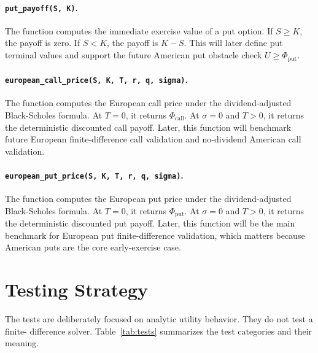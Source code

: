 \documentclass[11pt,a4paper]{article}
\newcommand{\code}[1]{\texttt{#1}}
\begin{document}
\paragraph{\code{put\_payoff(S, K)}.}
The function computes the immediate exercise value of a put option. If \(S\geq K\), the payoff is
zero. If \(S<K\), the payoff is \(K-S\). This will later define put terminal values and support the
future American put obstacle check \(U\geq\Phi_{\mathrm{put}}\).

\paragraph{\code{european\_call\_price(S, K, T, r, q, sigma)}.}
The function computes the European call price under the dividend-adjusted Black-Scholes formula.
At \(T=0\), it returns \(\Phi_{\mathrm{call}}\). At \(\sigma=0\) and \(T>0\), it returns the
deterministic discounted call payoff. Later, this function will benchmark future European
finite-difference call validation and no-dividend American call validation.

\paragraph{\code{european\_put\_price(S, K, T, r, q, sigma)}.}
The function computes the European put price under the dividend-adjusted Black-Scholes formula.
At \(T=0\), it returns \(\Phi_{\mathrm{put}}\). At \(\sigma=0\) and \(T>0\), it returns the
deterministic discounted put payoff. Later, this function will be the main benchmark for European
put finite-difference validation, which matters because American puts are the core early-exercise
case.

\section{Testing Strategy}

The tests are deliberately focused on analytic utility behavior. They do not test a finite-
difference solver. Table~\ref{tab:tests} summarizes the test categories and their meaning.
\end{document}
